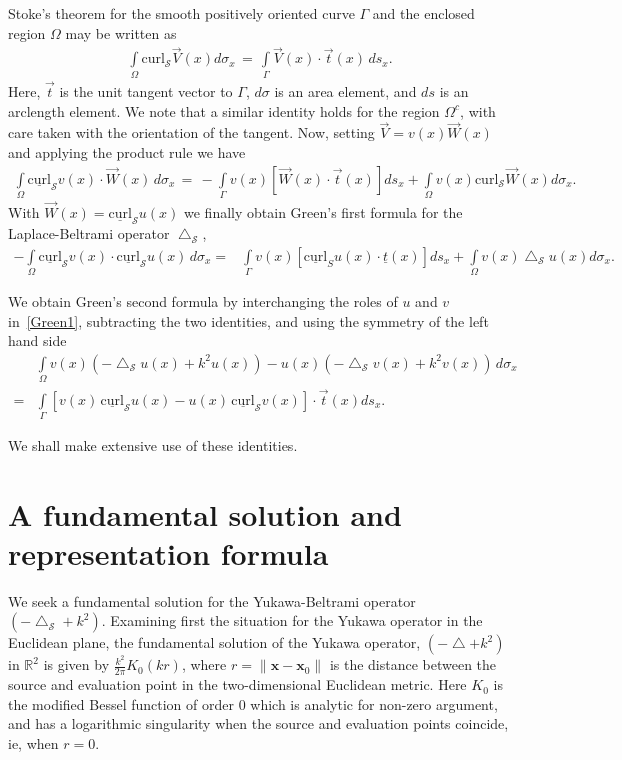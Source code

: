 \documentclass[final]{siamltex}
\newcommand{\lap}{\bigtriangleup}
\renewcommand{\S} {\mathcal{S}}
\begin{document}
Stoke's theorem for the  smooth positively oriented curve $\Gamma$ and the enclosed region
$\Omega$ may be written  as
\begin{align*}
\int\limits_{\Omega} \mbox{curl}_{\S} \vec{V}(x) d\sigma_x \, = \,
\int\limits_\Gamma \vec{V}(x) \cdot \vec{t}(x) \, ds_x .
\end{align*}
Here, $\vec{t}$ is the unit tangent vector to $\Gamma$, $d\sigma$ is an
area element, and $ds$ is an arclength element. We note that a similar
identity holds for the region $\Omega^{c}$, with care taken with the
orientation of the tangent.  Now, setting $\vec{V} = v(x) \vec{W}(x)$
and applying the product rule we have
\begin{align*}
\int\limits_{\Omega} \underline{\mbox{curl}}_{\S} v(x) \cdot
\vec{W}(x) \, d\sigma_x \, = \, 
-\int\limits_{\Gamma} v(x) [\vec{W}(x) \cdot \vec{t}(x)] ds_x +
\int\limits_{\Omega} v(x) \mbox{curl}_{\S} \vec{W}(x) d\sigma_x .
\end{align*}
With $\vec{W}(x) = \underline{\mbox{curl}}_{\S} u(x)$ we finally
obtain Green's first formula for the Laplace-Beltrami operator
$\lap_{\S}$,
\begin{align}
  \label{Green1}
  -\int\limits_{\Omega} \underline{\mbox{curl}}_{\S} v(x) \cdot
  \underline{\mbox{curl}}_{\S} u(x) \, d\sigma_x 
  =& \int\limits_{\Gamma} v(x) [\underline{\mbox{curl}}_S u(x) \cdot 
  \underline{t}(x)] ds_x +\int\limits_{\Omega} v(x) \lap_{\S}u(x) d\sigma_x.
\end{align}

We obtain Green's second formula by interchanging the roles of $u$ and
$v$ in~\eqref{Green1}, subtracting the two identities, and using the
symmetry of the left hand side
\begin{align}
  &\int\limits_{\Omega} v(x)(-\lap_{\S}u(x) + k^2 u(x))-
  u(x)(-\lap_{\S}v(x) +k^2v(x))\, d\sigma_x \nonumber \\
  =&\int\limits_\Gamma [v(x)\,\underline{\mbox{curl}}_{\S} 
  u(x) - u(x)\, \underline{\mbox{curl}}_{\S}v(x)] \cdot 
  \vec{t}(x) ds_x.
  \label{Green2}
\end{align}

We shall make extensive use of these identities.





\section{A fundamental solution and representation formula}
We seek a fundamental solution for the Yukawa-Beltrami operator
$(-\lap_\S + k^2)$.  Examining first the situation for the Yukawa
operator in the Euclidean plane, the fundamental solution of the Yukawa
operator, $(-\lap + k^2)$ in $\mathbb{R}^2$ is given by
$\frac{k^2}{2\pi} K_{0}(kr)$, where $r=\|\mathbf{x} - \mathbf{x}_{0}\|$
is the distance between the source and evaluation point in the
two-dimensional Euclidean metric. Here $K_{0}$ is the modified Bessel
function of order 0 which is analytic for non-zero argument, and has a
logarithmic singularity when the source and evaluation points coincide,
ie, when $r=0$.
\end{document}
